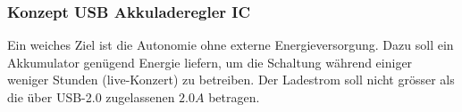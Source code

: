 \subsubsection{Konzept USB Akkuladeregler IC}
\label{sec:Konzept_Charger}

Ein weiches Ziel ist die Autonomie ohne externe Energieversorgung. 
Dazu soll ein Akkumulator genügend Energie liefern, um die Schaltung während einiger weniger Stunden (live-Konzert) zu betreiben. 
Der Ladestrom soll nicht grösser als die über USB-2.0 zugelassenen $2.0\si{A}$ betragen.





